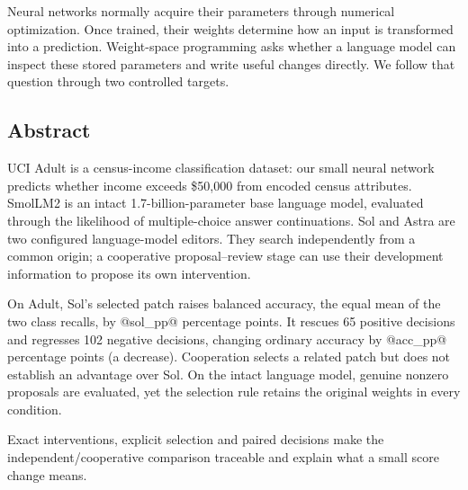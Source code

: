 Neural networks normally acquire their parameters through numerical optimization. Once trained, their weights determine how an input is transformed into a prediction. Weight-space programming asks whether a language model can inspect these stored parameters and write useful changes directly. We follow that question through two controlled targets.

\subsection*{Abstract}
UCI Adult is a census-income classification dataset: our small neural network predicts whether income exceeds \$50,000 from encoded census attributes. SmolLM2 is an intact 1.7-billion-parameter base language model, evaluated through the likelihood of multiple-choice answer continuations. Sol and Astra are two configured language-model editors. They search independently from a common origin; a cooperative proposal--review stage can use their development information to propose its own intervention.

On Adult, Sol's selected patch raises balanced accuracy, the equal mean of the two class recalls, by @sol_pp@ percentage points. It rescues 65 positive decisions and regresses 102 negative decisions, changing ordinary accuracy by @acc_pp@ percentage points (a decrease). Cooperation selects a related patch but does not establish an advantage over Sol. On the intact language model, genuine nonzero proposals are evaluated, yet the selection rule retains the original weights in every condition.

Exact interventions, explicit selection and paired decisions make the independent/cooperative comparison traceable and explain what a small score change means.



